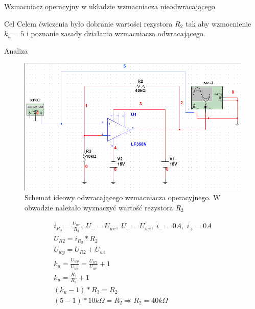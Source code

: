 \documentclass[a4paper]{scrartcl}
\begin{document}
	\begin{section}{Wzmacniacz operacyjny w układzie wzmacniacza nieodwracającego}
		\begin{subsection}{Cel}
			Celem ćwiczenia było dobranie wartości rezystora $R_{2}$ tak aby wzmocnienie $k_{u} = 5 $ i poznanie zasady działania wzmacniacza odwracającego.
		\end{subsection}
		\begin{subsection}{Analiza}
				\begin{figure}[ht]
				\begin{center}
					\includegraphics[width=0.7\linewidth]{05-circuit-labels}
					\caption{Schemat ideowy odwracającego wzmacniacza operacyjnego. W obwodzie należało wyznaczyć wartość rezystora $ R_{2} $ }
					\label{fig:circuit-05}
				\end{center}
				\end{figure}
				\begin{gather*}
					 i_{R_{3}} = \frac{U_{we}}{R_{3}},\; U_{-} = U_{we},\; U_{+} = U_{we},\; i_{-} = 0A,\; i_{+} = 0A  \\
					 U_{R2} = i_{R_{3}}*R_{2}  \\
					 U_{wy} = U_{R2} + U_{we}  \\
					 k_{u} = \frac{U_{wy}}{U_{we}} = \frac{U_{R2}}{U_{we}} + 1  \\
					 k_{u} = \frac{R_{2}}{R_{3}} + 1  \\
					 (k_{u} - 1)*R_{3} = R_{2}  \\
					 (5 - 1) * 10k\Omega = R_{2} \Rightarrow R_{2} = 40k\Omega 
				\end{gather*}


\end{subsection}
\end{section}
\end{document}
